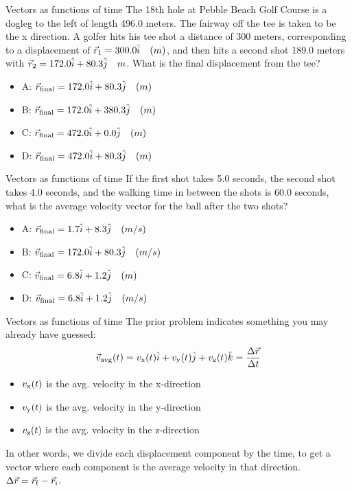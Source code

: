 \documentclass{beamer}
\begin{document}
\begin{frame}{Vectors as functions of time}
\small
The 18th hole at Pebble Beach Golf Course is a dogleg to the left of length 496.0 meters.  The fairway off the tee is taken to be the x direction.  A golfer hits his tee shot a distance of 300 meters, corresponding to a displacement of $\vec{r}_{\rm 1} = 300.0 \hat{i} \quad (m)$, and then hits a second shot 189.0 meters with $\vec{r}_{\rm 2} = 172.0 \hat{i} + 80.3 \hat{j} \quad m$.  What is the final displacement from the tee?
\begin{itemize}
\item A: $\vec{r}_{\rm final} = 172.0 \hat{i} + 80.3\hat{j}\quad (m)$
\item B: $\vec{r}_{\rm final} = 172.0 \hat{i} + 380.3\hat{j}\quad (m)$
\item C: $\vec{r}_{\rm final} = 472.0 \hat{i} + 0.0\hat{j}\quad (m)$
\item D: $\vec{r}_{\rm final} = 472.0 \hat{i} + 80.3\hat{j}\quad (m)$
\end{itemize}
\end{frame}

\begin{frame}{Vectors as functions of time}
\small
If the first shot takes 5.0 seconds, the second shot takes 4.0 seconds, and the walking time in between the shots is 60.0 seconds, what is the average velocity vector for the ball after the two shots?
\begin{itemize}
\item A: $\vec{r}_{\rm final} = 1.7 \hat{i} + 8.3\hat{j}\quad (m/s)$
\item B: $\vec{v}_{\rm final} = 172.0 \hat{i} + 80.3\hat{j}\quad (m/s)$
\item C: $\vec{v}_{\rm final} = 6.8 \hat{i} + 1.2\hat{j}\quad (m)$
\item D: $\vec{v}_{\rm final} = 6.8 \hat{i} + 1.2\hat{j}\quad (m/s)$
\end{itemize}
\end{frame}

\begin{frame}{Vectors as functions of time}
The prior problem indicates something you may already have guessed:
\begin{equation}
\vec{v}_{\rm avg}(t) = v_{\rm x}(t) \hat{i} + v_{\rm y}(t) \hat{j} + v_{\rm z}(t) \hat{k} = \frac{\Delta\vec{r}}{\Delta t}
\label{eq:vel}
\end{equation}
\begin{itemize}
\item $v_{\rm x}(t)$ is the avg. velocity in the x-direction
\item $v_{\rm y}(t)$ is the avg. velocity in the y-direction
\item $v_{\rm z}(t)$ is the avg. velocity in the z-direction
\end{itemize}
In other words, we divide each displacement component by the time, to get a vector where each component is the average velocity in that direction.  $\Delta\vec{r} = \vec{r}_{\rm f} - \vec{r}_{\rm i}$.
\end{frame}
\end{document}
